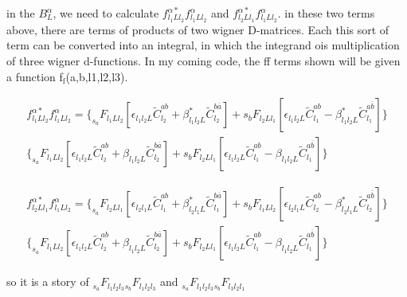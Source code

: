 \documentclass[11pt]{article}
\begin{document}
in the $B_{L}^{\alpha}$, we need to calculate $f_{l_{1} L l_{2}}^{\alpha *}f_{l_{1}Ll_{2}}^{\alpha}$ and $f_{l_{2} L l_{1}}^{\alpha *}f_{l_{1}Ll_{2}}^{\alpha}$. 
in these two terms above, there are terms of products of two wigner D-matrices. Each this sort of term can be converted into an integral, in which the integrand ois multiplication of three wigner d-functions. In my coming code, the ff terms shown will be given a function f$_{\text{f}}$(a,b,l1,l2,l3). 


\begin{equation}
\begin{split}
f_{l_{1} L l_{2}}^{\alpha *}f_{l_{1}Ll_{2}}^{\alpha}=\big\{_{s_{a}} F_{l_{1} L l_{2}}\left[\epsilon_{l_{1} l_{2} L} \tilde{C}_{l_{2}}^{a b}+\beta^{*}_{l_{1} l_{2} L} \tilde{C}_{l_{2}}^{b \overline{a}}\right]+s_{b} F_{l_{2} L l_{1}}\left[\epsilon_{l_{1} l_{2} L} \tilde{C}_{l_{1}}^{a b}-\beta^{*}_{l_{1} l_{2} L} \tilde{C}_{l_{1}}^{a \overline{b}}\right]\big\} \\
\big\{_{s_{a}} F_{l_{1} L l_{2}}\left[\epsilon_{l_{1} l_{2} L} \tilde{C}_{l_{2}}^{a b}+\beta_{l_{1} l_{2} L} \tilde{C}_{l_{2}}^{b \overline{a}}\right]+s_{b} F_{l_{2} L l_{1}}\left[\epsilon_{l_{1} l_{2} L} \tilde{C}_{l_{1}}^{a b}-\beta_{l_{1} l_{2} L} \tilde{C}_{l_{1}}^{a \overline{b}}\right]\big\}
\end{split}
\end{equation}

\begin{equation}
\begin{split}
f_{l_{2} L l_{1}}^{\alpha *}f_{l_{1}Ll_{2}}^{\alpha}=\big\{_{s_{a}} F_{l_{2} L l_{1}}\left[\epsilon_{l_{2} l_{1} L} \tilde{C}_{l_{1}}^{a b}+\beta^{*}_{l_{2} l_{1} L} \tilde{C}_{l_{1}}^{b \overline{a}}\right]+s_{b} F_{l_{1} L l_{2}}\left[\epsilon_{l_{2} l_{1} L} \tilde{C}_{l_{2}}^{a b}-\beta^{*}_{l_{2} l_{1} L} \tilde{C}_{l_{2}}^{a \overline{b}}\right]\big\}\\ 
\big\{_{s_{a}} F_{l_{1} L l_{2}}\left[\epsilon_{l_{1} l_{2} L} \tilde{C}_{l_{2}}^{a b}+\beta_{l_{1} l_{2} L} \tilde{C}_{l_{2}}^{b \overline{a}}\right]+s_{b} F_{l_{2} L l_{1}}\left[\epsilon_{l_{1} l_{2} L} \tilde{C}_{l_{1}}^{a b}-\beta_{l_{1} l_{2} L} \tilde{C}_{l_{1}}^{a \overline{b}}\right]\big\}
\end{split}
\end{equation}


so it is a story of $_{s_{a}} F_{l_{1} l_{2} l_{3}}{_{s_{b}} F_{l_{1} l_{2} l_{3}}}$ and $_{s_{a}} F_{l_{1} l_{2} l_{3}}{_{s_{b}} F_{l_{3} l_{2} l_{1}}}$
\end{document}
